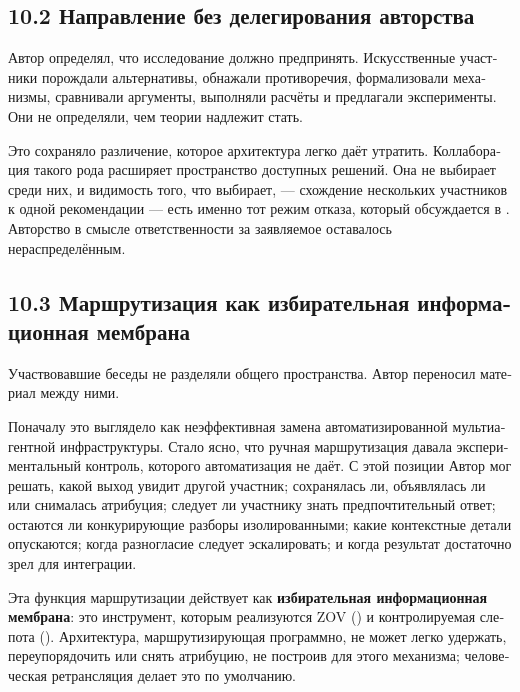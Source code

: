 \begin{russian}
\subsection*{10.2 Направление без делегирования авторства}
\label{sec:ru:10.2}

Автор определял, что исследование должно предпринять. Искусственные участники порождали альтернативы, обнажали противоречия, формализовали механизмы, сравнивали аргументы, выполняли расчёты и предлагали эксперименты. Они не определяли, чем теории надлежит стать.

Это сохраняло различение, которое архитектура легко даёт утратить. Коллаборация такого рода расширяет пространство доступных решений. Она не выбирает среди них, и видимость того, что выбирает, — схождение нескольких участников к одной рекомендации — есть именно тот режим отказа, который обсуждается в . Авторство в смысле ответственности за заявляемое оставалось нераспределённым.


\subsection*{10.3 Маршрутизация как избирательная информационная мембрана}
\label{sec:ru:10.3}

Участвовавшие беседы не разделяли общего пространства. Автор переносил материал между ними.

Поначалу это выглядело как неэффективная замена автоматизированной мультиагентной инфраструктуры. Стало ясно, что ручная маршрутизация давала экспериментальный контроль, которого автоматизация не даёт. С этой позиции Автор мог решать, какой выход увидит другой участник; сохранялась ли, объявлялась ли или снималась атрибуция; следует ли участнику знать предпочтительный ответ; остаются ли конкурирующие разборы изолированными; какие контекстные детали опускаются; когда разногласие следует эскалировать; и когда результат достаточно зрел для интеграции.

Эта функция маршрутизации действует как \textbf{избирательная информационная мембрана}: это инструмент, которым реализуются ZOV () и контролируемая слепота (). Архитектура, маршрутизирующая программно, не может легко удержать, переупорядочить или снять атрибуцию, не построив для этого механизма; человеческая ретрансляция делает это по умолчанию.


\end{russian}
